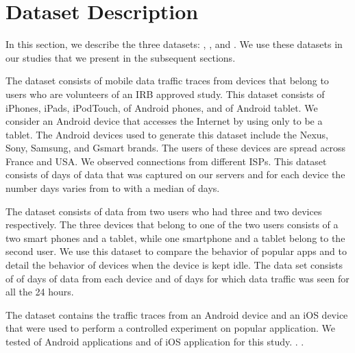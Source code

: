 \section{Dataset Description}
\label{sec:dataset}

In this section, we describe the three datasets: \moball, \mobcomp, and \mobexpt. 
We use these datasets in our studies that we present in the subsequent sections.

The \moball dataset consists of mobile data traffic traces from  devices that belong to  users who are volunteers of an IRB approved study. 
This dataset consists of  iPhones,  iPads,  iPodTouch,  of Android phones, and  of Android tablet.
We consider an Android device that accesses the Internet by using only \wifi to be a tablet. 
The Android devices used to generate this dataset include the Nexus, Sony, Samsung, and Gsmart brands. 
The users of these devices are spread across France and USA. We observed connections from  different ISPs.
This dataset consists of  days of data that was captured on our servers and for each device the number days varies from  to  with a median of  days.  

The \mobcomp dataset consists of data from two users who had three and two devices respectively. 
The three devices that belong to one of the two users consists of a two smart phones and a tablet, while one smartphone and a tablet belong to the second user. 
We use this dataset to compare the behavior of popular apps and to detail the behavior of devices when the device is kept idle. 
The data set consists of  of days of data from each device and  of days for which data traffic was seen for all the 24 hours. 

The \mobexpt dataset contains the traffic traces from an Android device and an iOS device that were used to perform a controlled experiment on popular application. 
We tested  of Android applications and  of iOS application for this study. 
.  .

